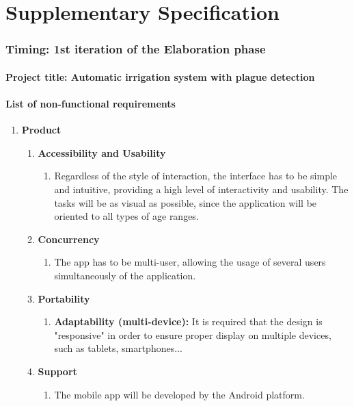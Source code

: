 \documentclass[11pt,a4paper]{article}
\begin{document}
\part{Supplementary Specification}
\section{Timing: 1st iteration of the Elaboration phase}
\subsection*{Project title: Automatic irrigation system with plague detection}
\subsection{List of non-functional requirements}
\begin{enumerate}
\item \textbf{Product}
	\begin{enumerate}
	
	\item \textbf{Accessibility and Usability}
		\begin{enumerate}
		\item Regardless of the style of interaction, the interface has to be simple and intuitive, providing a high level of interactivity and usability. The tasks will be as visual as possible, since the application will be oriented to all types of age ranges. 
		\end{enumerate}
	\item \textbf{Concurrency}
		\begin{enumerate}
		\item  The app has to be multi-user, allowing the usage of several users simultaneously of the application.
		\end{enumerate}
		
	\item \textbf{Portability}
		\begin{enumerate}
		\item \textbf{Adaptability (multi-device):} It is required that the design is "responsive" in order to ensure proper display on multiple devices, such as tablets, smartphones...
		\end{enumerate}
		
	\item \textbf{Support}
		\begin{enumerate}
		\item The mobile app will be developed by the Android platform.
		\end{enumerate}
	\end{enumerate}


\end{enumerate}
\end{document}
